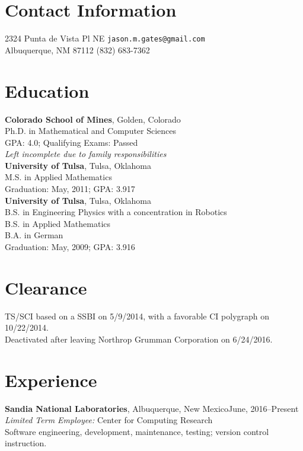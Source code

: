 \documentclass[margin,line,pifont,palatino,10pt]{res}
\begin{document}
\thispagestyle{empty}


\begin{resume}
\section{\sc Contact Information}
2324 Punta de Vista Pl NE
\hfill \texttt{\small jason.m.gates@gmail.com}\\
Albuquerque, NM 87112
\hfill (832) 683-7362

\vspace{1.5mm}
\section{\sc Education}
{\bf Colorado School of Mines}, Golden, Colorado\\
Ph.D. in Mathematical and Computer Sciences\\
GPA: 4.0; Qualifying Exams: Passed\\
{\em Left incomplete due to family responsibilities}\vspace{.1in}\\
{\bf University of Tulsa}, Tulsa, Oklahoma\\
M.S. in Applied Mathematics\\
Graduation: May, 2011; GPA: 3.917\vspace{.1in}\\
{\bf University of Tulsa}, Tulsa, Oklahoma\\
B.S. in Engineering Physics with a concentration in Robotics\\
B.S. in Applied Mathematics\\
B.A. in German\\
Graduation: May, 2009; GPA: 3.916

\vspace{1.5mm}
\section{\sc Clearance}
TS/SCI based on a SSBI on 5/9/2014, with a favorable CI polygraph on 10/22/2014.\\
Deactivated after leaving Northrop Grumman Corporation on 6/24/2016.

\vspace{1.5mm}
\section{\sc Experience}
{\bf Sandia National Laboratories}, Albuquerque, New Mexico\hfill June, 2016--Present\\
{\em Limited Term Employee:}  Center for Computing Research\\
Software engineering, development, maintenance, testing; version control instruction.


\end{resume}
\end{document}
